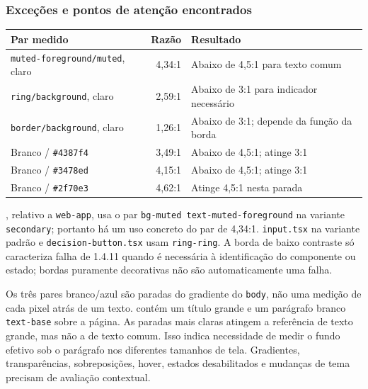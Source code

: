 \documentclass[12pt,a4paper]{article}
\begin{document}
\subsubsection{Exceções e pontos de atenção encontrados}
\begin{center}
\small
\begin{tabularx}{\textwidth}{>{\raggedright\arraybackslash}X r >{\raggedright\arraybackslash}p{5cm}}
\hline
\textbf{Par medido} & \textbf{Razão} & \textbf{Resultado} \\
\hline
\texttt{muted-foreground/muted}, claro & 4,34:1 & Abaixo de 4,5:1 para texto comum \\
\texttt{ring/background}, claro & 2,59:1 & Abaixo de 3:1 para indicador necessário \\
\texttt{border/background}, claro & 1,26:1 & Abaixo de 3:1; depende da função da borda \\
Branco / \texttt{\#4387f4} & 3,49:1 & Abaixo de 4,5:1; atinge 3:1 \\
Branco / \texttt{\#3478ed} & 4,15:1 & Abaixo de 4,5:1; atinge 3:1 \\
Branco / \texttt{\#2f70e3} & 4,62:1 & Atinge 4,5:1 nesta parada \\
\hline
\end{tabularx}
\end{center}

, relativo a \texttt{web-app}, usa o par \texttt{bg-muted text-muted-foreground} na variante \texttt{secondary}; portanto há um uso concreto do par de 4,34:1. \texttt{input.tsx} na variante padrão e \texttt{decision-button.tsx} usam \texttt{ring-ring}. A borda de baixo contraste só caracteriza falha de 1.4.11 quando é necessária à identificação do componente ou estado; bordas puramente decorativas não são automaticamente uma falha.

Os três pares branco/azul são paradas do gradiente do \texttt{body}, não uma medição de cada pixel atrás de um texto.  contém um título grande e um parágrafo branco \texttt{text-base} sobre a página. As paradas mais claras atingem a referência de texto grande, mas não a de texto comum. Isso indica necessidade de medir o fundo efetivo sob o parágrafo nos diferentes tamanhos de tela. Gradientes, transparências, sobreposições, hover, estados desabilitados e mudanças de tema precisam de avaliação contextual.
\end{document}
